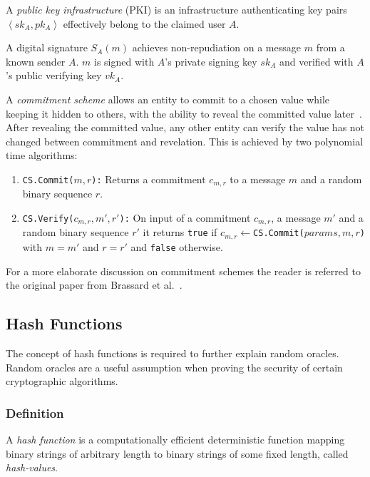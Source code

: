\begin{defn}[PKI]
\label{def:pki}
 A \textit{public key infrastructure} (PKI) is an infrastructure authenticating key pairs $\left< sk_A, pk_A \right>$ effectively belong to the claimed user $A$.
\end{defn}

\begin{defn}
\label{def:digital_signature}
 A digital signature $S_A \left( m \right)$ achieves non-repudiation on a message $m$ from a known sender $A$. $m$ is signed with $A$'s private signing key $sk_A$ and verified with $A$'s public verifying key $vk_A$.
\end{defn}

\begin{defn}
\label{def:commitment_scheme}
 A \textit{commitment scheme} allows an entity to commit to a chosen value while keeping it hidden to others, with the ability to reveal the committed value later~\cite{book:Goldreich97}. After revealing the committed value, any other entity can verify the value has not changed between commitment and revelation. This is achieved by two polynomial time algorithms:
 \begin{enumerate}
   \item \texttt{CS.Commit($m, r$):} Returns a commitment $c_{m,r}$ to a message $m$ and a random binary sequence $r$.
 \item \texttt{CS.Verify($c_{m,r}, m', r'$):} On input of a commitment $c_{m,r}$, a message $m'$ and a random binary sequence $r'$ it returns \texttt{true} if $c_{m,r} \leftarrow $\texttt{CS.Commit($params, m, r$)} with $m = m'$ and $r = r'$ and \texttt{false} otherwise.
 \end{enumerate}
\end{defn}
For a more elaborate discussion on commitment schemes the reader is referred to the original paper from Brassard et al.~\cite{art:BrassardCC88}.

\subsection{Hash Functions}
The concept of hash functions is required to further explain random oracles. Random oracles are a useful assumption when proving the security of certain cryptographic algorithms.

\label{sec:hash_functions}
\subsubsection{Definition}
A \textit{hash function} is a computationally efficient deterministic function mapping binary strings of arbitrary length to binary strings of some fixed length, called \textit{hash-values}.

